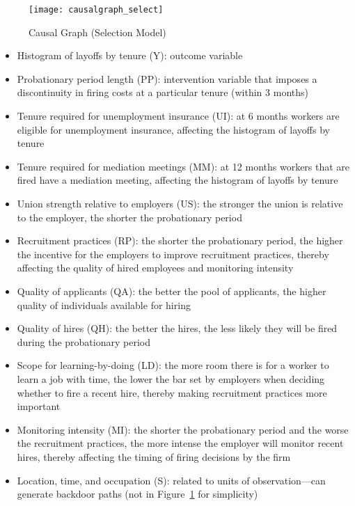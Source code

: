 \documentclass[12pt]{article}
\begin{document}
\newpage

\begin{figure}[h!]
  \centering
  \texttt{[image: causalgraph\_select]}
  \caption{Causal Graph (Selection Model)}
  \label{fig:causalgraph_select}
\end{figure}

\begin{itemize}
 \item Histogram of layoffs by tenure (Y): outcome variable
 \item Probationary period length (PP): intervention variable that imposes a discontinuity in firing costs at a particular tenure (within 3 months)
 \item Tenure required for unemployment insurance (UI): at 6 months workers are eligible for unemployment insurance, affecting the histogram of layoffs by tenure
 \item Tenure required for mediation meetings (MM): at 12 months workers that are fired have a mediation meeting, affecting the histogram of layoffs by tenure
 \item Union strength relative to employers (US): the stronger the union is relative to the employer, the shorter the probationary period
 \item Recruitment practices (RP): the shorter the probationary period, the higher the incentive for the employers to improve recruitment practices, thereby affecting the quality of hired employees and monitoring intensity
 \item Quality of applicants (QA): the better the pool of applicants, the higher quality of individuals available for hiring
 \item Quality of hires (QH): the better the hires, the less likely they will be fired during the probationary period
 \item Scope for learning-by-doing (LD): the more room there is for a worker to learn a job with time, the lower the bar set by employers when deciding whether to fire a recent hire, thereby making recruitment practices more important
 \item Monitoring intensity (MI): the shorter the probationary period and the worse the recruitment practices, the more intense the employer will monitor recent hires, thereby affecting the timing of firing decisions by the firm
 \item Location, time, and occupation (S): related to units of observation---can generate backdoor paths (not in Figure~\ref{fig:causalgraph_select} for simplicity)
\end{itemize}
\end{document}
